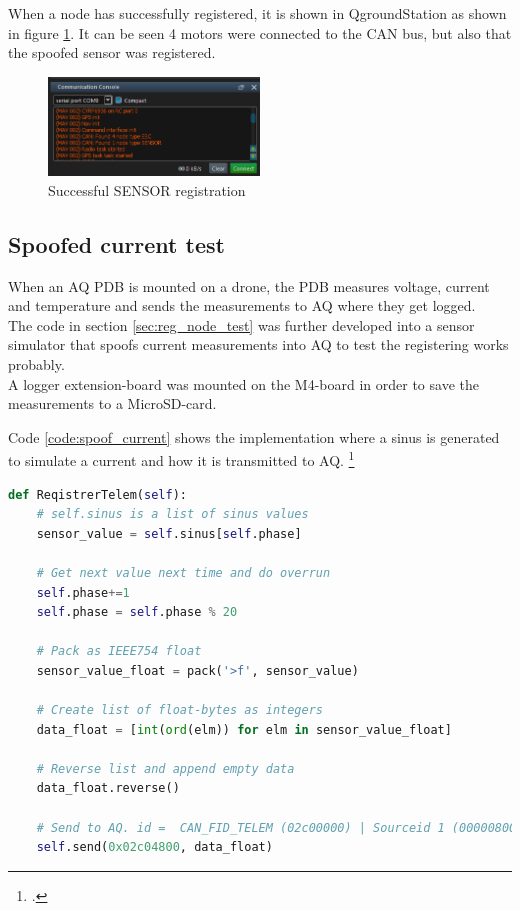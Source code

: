 When a node has successfully registered, it is shown in QgroundStation as shown in figure \ref{fig:successful_register}.
It can be seen 4 motors were connected to the CAN bus, but also that the spoofed sensor was registered.

\begin{figure}[H]
    \center
    \includegraphics[width=0.5\textwidth]{graphics/test_register_node.png}
    \caption{Successful SENSOR registration}
    \label{fig:successful_register}
\end{figure}

\subsection{Spoofed current test}
When an AQ PDB is mounted on a drone, the PDB measures voltage, current and temperature and sends the measurements to AQ where they get logged.\\
The code in section \ref{sec:reg_node_test} was further developed into a sensor simulator that spoofs current measurements into AQ to test the registering works probably. \\
A logger extension-board was mounted on the M4-board in order to save the measurements to a MicroSD-card.

Code \ref{code:spoof_current} shows the implementation where a sinus is generated to simulate a current and how it is transmitted to AQ. \footcite{someguy2993}

\begin{lstlisting}[language = python, caption = Snippet spoofing current measurements into AQ, label=code:spoof_current]
def ReqistrerTelem(self):
	# self.sinus is a list of sinus values
	sensor_value = self.sinus[self.phase]

	# Get next value next time and do overrun
	self.phase+=1
	self.phase = self.phase % 20

	# Pack as IEEE754 float
	sensor_value_float = pack('>f', sensor_value)

	# Create list of float-bytes as integers
	data_float = [int(ord(elm)) for elm in sensor_value_float]

	# Reverse list and append empty data
	data_float.reverse()
	
	# Send to AQ. id =  CAN_FID_TELEM (02c00000) | Sourceid 1 (00000800) | CAN_SENSORS_PDB_BATA (00004000)
	self.send(0x02c04800, data_float)
\end{lstlisting}

